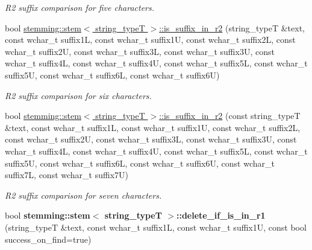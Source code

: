 \begin{DoxyCompactItemize}
\begin{DoxyCompactList}\small\item\em R2 suffix comparison for five characters. \end{DoxyCompactList}\item 
\hypertarget{group___stemming_gad85a9757083c5fcbd6300367df2a648b}{bool \hyperlink{group___stemming_gad85a9757083c5fcbd6300367df2a648b}{stemming\-::stem$<$ string\-\_\-type\-T $>$\-::is\-\_\-suffix\-\_\-in\-\_\-r2} (string\-\_\-type\-T \&text, const wchar\-\_\-t suffix1\-L, const wchar\-\_\-t suffix1\-U, const wchar\-\_\-t suffix2\-L, const wchar\-\_\-t suffix2\-U, const wchar\-\_\-t suffix3\-L, const wchar\-\_\-t suffix3\-U, const wchar\-\_\-t suffix4\-L, const wchar\-\_\-t suffix4\-U, const wchar\-\_\-t suffix5\-L, const wchar\-\_\-t suffix5\-U, const wchar\-\_\-t suffix6\-L, const wchar\-\_\-t suffix6\-U)}\label{group___stemming_gad85a9757083c5fcbd6300367df2a648b}

\begin{DoxyCompactList}\small\item\em R2 suffix comparison for six characters. \end{DoxyCompactList}\item 
\hypertarget{group___stemming_ga65e9882d17885e66208840b277fcee2e}{bool \hyperlink{group___stemming_ga65e9882d17885e66208840b277fcee2e}{stemming\-::stem$<$ string\-\_\-type\-T $>$\-::is\-\_\-suffix\-\_\-in\-\_\-r2} (const string\-\_\-type\-T \&text, const wchar\-\_\-t suffix1\-L, const wchar\-\_\-t suffix1\-U, const wchar\-\_\-t suffix2\-L, const wchar\-\_\-t suffix2\-U, const wchar\-\_\-t suffix3\-L, const wchar\-\_\-t suffix3\-U, const wchar\-\_\-t suffix4\-L, const wchar\-\_\-t suffix4\-U, const wchar\-\_\-t suffix5\-L, const wchar\-\_\-t suffix5\-U, const wchar\-\_\-t suffix6\-L, const wchar\-\_\-t suffix6\-U, const wchar\-\_\-t suffix7\-L, const wchar\-\_\-t suffix7\-U)}\label{group___stemming_ga65e9882d17885e66208840b277fcee2e}

\begin{DoxyCompactList}\small\item\em R2 suffix comparison for seven characters. \end{DoxyCompactList}\item 
\hypertarget{group___stemming_ga3bda630783eae1661f00fc5d2b51ce5c}{bool {\bfseries stemming\-::stem$<$ string\-\_\-type\-T $>$\-::delete\-\_\-if\-\_\-is\-\_\-in\-\_\-r1} (string\-\_\-type\-T \&text, const wchar\-\_\-t suffix1\-L, const wchar\-\_\-t suffix1\-U, const bool success\-\_\-on\-\_\-find=true)}\label{group___stemming_ga3bda630783eae1661f00fc5d2b51ce5c}


\end{DoxyCompactItemize}
